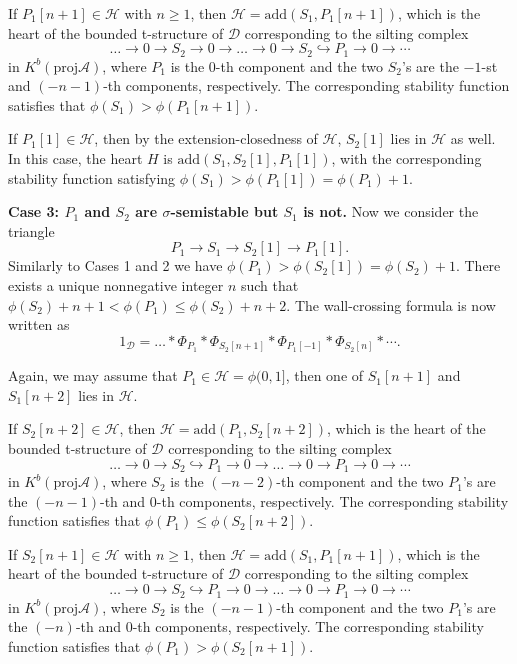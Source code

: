 \documentclass[a4paper,12pt]{amsart}
\newcommand{\add}{\mathrm{add}}
\newcommand{\proj}{\mathrm{proj}}
\begin{document}
If $P_1[n+1]\in\mathcal{H}$ with $n\geqslant1$, then $\mathcal{H}=\add(S_1,P_1[n+1])$, which is the heart of the bounded t-structure of $\mathcal{D}$ corresponding to the silting complex
\[\dots\rightarrow0\rightarrow S_2\rightarrow0\rightarrow\dots\rightarrow0\rightarrow S_2\hookrightarrow P_1\rightarrow0\rightarrow\cdots\]
in $K^b(\proj\mathcal{A})$, where $P_1$ is the $0$-th component and the two $S_2$'s are the $-1$-st and $(-n-1)$-th components, respectively. The corresponding stability function satisfies that $\phi(S_1)>\phi(P_1[n+1])$.

If $P_1[1]\in\mathcal{H}$, then by the extension-closedness of $\mathcal{H}$, $S_2[1]$ lies in $\mathcal{H}$ as well. In this case, the heart $H$ is $\add(S_1,S_2[1],P_1[1])$, with the corresponding stability function satisfying $\phi(S_1)>\phi(P_1[1])=\phi(P_1)+1$.

\textbf{Case 3: $P_1$ and $S_2$ are $\sigma$-semistable but $S_1$ is not.} Now we consider the triangle
\[P_1\rightarrow S_1\rightarrow S_2[1]\rightarrow P_1[1].\]
Similarly to Cases 1 and 2 we have $\phi(P_1)>\phi(S_2[1])=\phi(S_2)+1$. There exists a unique nonnegative integer $n$ such that $\phi(S_2)+n+1<\phi(P_1)\leqslant\phi(S_2)+n+2$. The wall-crossing formula is now written as
\begin{equation}\label{3}
    1_\mathcal{D}=\dots*\Phi_{P_1}*\Phi_{S_2[n+1]}*\Phi_{P_1[-1]}*\Phi_{S_2[n]}*\cdots.
\end{equation}

Again, we may assume that $P_1\in\mathcal{H}=\phi(0,1]$, then one of $S_1[n+1]$ and $S_1[n+2]$ lies in $\mathcal{H}$. 

If $S_2[n+2]\in\mathcal{H}$, then $\mathcal{H}=\add(P_1,S_2[n+2])$, which is the heart of the bounded t-structure of $\mathcal{D}$ corresponding to the silting complex
\[\dots\rightarrow0\rightarrow S_2\hookrightarrow P_1\rightarrow0\rightarrow\dots\rightarrow0\rightarrow P_1\rightarrow0\rightarrow\cdots\]
in $K^b(\proj\mathcal{A})$, where $S_2$ is the $(-n-2)$-th component and the two $P_1$'s are the $(-n-1)$-th and $0$-th components, respectively. The corresponding stability function satisfies that $\phi(P_1)\leqslant\phi(S_2[n+2])$.

If $S_2[n+1]\in\mathcal{H}$ with $n\geqslant1$, then $\mathcal{H}=\add(S_1,P_1[n+1])$, which is the heart of the bounded t-structure of $\mathcal{D}$ corresponding to the silting complex
\[\dots\rightarrow0\rightarrow S_2\hookrightarrow P_1\rightarrow0\rightarrow\dots\rightarrow0\rightarrow P_1\rightarrow0\rightarrow\cdots\]
in $K^b(\proj\mathcal{A})$, where $S_2$ is the $(-n-1)$-th component and the two $P_1$'s are the $(-n)$-th and $0$-th components, respectively. The corresponding stability function satisfies that $\phi(P_1)>\phi(S_2[n+1])$.
\end{document}
